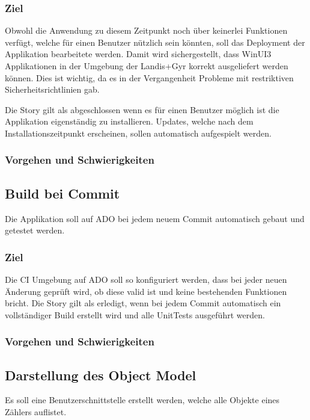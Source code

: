 \subsubsection{Ziel}
Obwohl die Anwendung zu diesem Zeitpunkt noch über keinerlei Funktionen verfügt, welche für einen Benutzer nützlich sein könnten, soll das Deployment der Applikation bearbeitete werden.
Damit wird sichergestellt, dass WinUI3 Applikationen in der Umgebung der Landis+Gyr korrekt ausgeliefert werden können.
Dies ist wichtig, da es in der Vergangenheit Probleme mit restriktiven Sicherheitsrichtlinien gab.

Die Story gilt als abgeschlossen wenn es für einen Benutzer möglich ist die Applikation eigenständig zu installieren.
Updates, welche nach dem Installationszeitpunkt erscheinen, sollen automatisch aufgespielt werden.
\subsubsection{Vorgehen und Schwierigkeiten}



\subsection{Build bei Commit}
\dq Die Applikation soll auf \ac{ADO} bei jedem neuem Commit automatisch gebaut und getestet werden.\dq

\subsubsection{Ziel}
Die \ac{CI} Umgebung auf \ac{ADO} soll so konfiguriert werden, dass bei jeder neuen Änderung geprüft wird, ob diese valid ist und keine bestehenden Funktionen bricht.
Die Story gilt als erledigt, wenn bei jedem Commit automatisch ein vollständiger Build erstellt wird und alle UnitTests ausgeführt werden.

\subsubsection{Vorgehen und Schwierigkeiten}

\subsection{Darstellung des Object Model}
\dq Es soll eine Benutzerschnittstelle erstellt werden, welche alle Objekte eines Zählers auflistet.\dq

